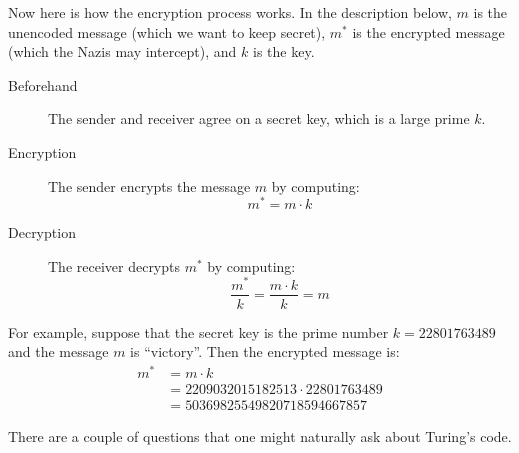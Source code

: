 Now here is how the encryption process works.  In the description
below, $m$ is the unencoded message (which we want to keep secret),
$m^*$ is the encrypted message (which the Nazis may intercept), and
$k$ is the key.

\begin{description}

\item[Beforehand] The sender and receiver agree on a secret key, which
is a large prime $k$.

\item[Encryption] The sender encrypts the message $m$ by computing:
\[
m^* = m \cdot k
\]

\item[Decryption] The receiver decrypts $m^*$ by computing:
\[
\frac{m^*}{k} = \frac{m \cdot k}{k} = m
\]

\end{description}

For example, suppose that the secret key is the prime number $k =
22801763489$ and the message $m$ is ``victory''.  Then the encrypted
message is:
%
\begin{align*}
m^* & = m \cdot k \\
   & = 2209032015182513 \cdot 22801763489 \\
   & = 50369825549820718594667857
\end{align*}

There are a couple of questions that one might naturally ask about Turing's
code.

